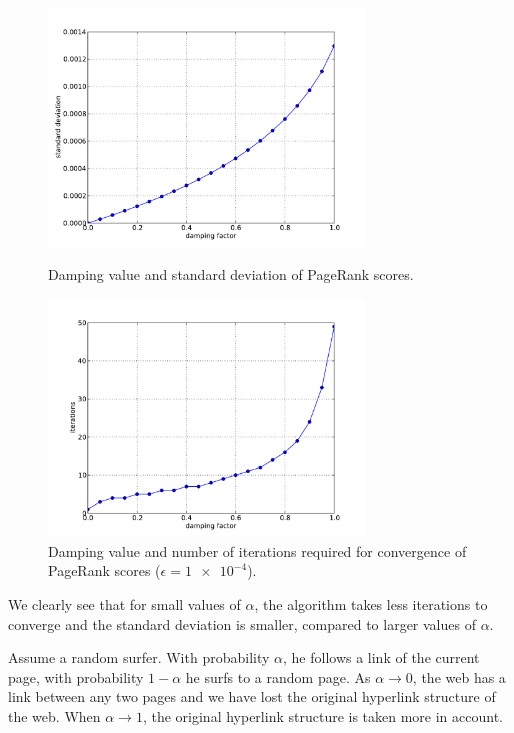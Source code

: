 \documentclass[a4paper,english,11pt]{scrartcl}
\begin{document}
\begin{figure}[hbpt] \centering
 \includegraphics[width=0.75\textwidth]{standard_deviation}
 \caption{Damping value and standard deviation of PageRank scores. \label{fig:std}}

 \includegraphics[width=0.75\textwidth]{iterations}
 \caption{Damping value and number of iterations required for convergence of PageRank scores ($\epsilon=\num{1e-4}$). \label{fig:iterations}}
\end{figure}

We clearly see that for small values of $\alpha$, the algorithm takes less iterations to converge and the standard deviation is smaller, compared to larger values of $\alpha$.

Assume a random surfer. With probability $\alpha$, he follows a link of the current page, with probability $1 − \alpha$ he surfs to a random page.
As $\alpha\rightarrow{}0$, the web has a link between any two pages and we have lost the original hyperlink structure of the web.
When $\alpha\rightarrow{}1$, the original hyperlink structure is taken more in account. 
\end{document}
